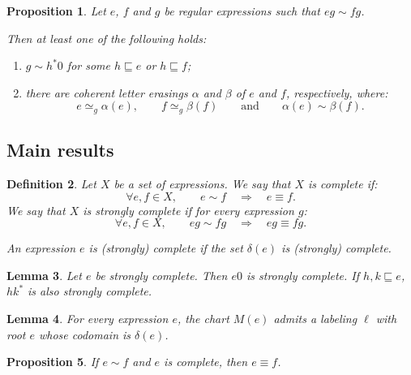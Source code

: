 \documentclass{article}
\newtheorem{definition}{Definition}[section]
\newtheorem{lemma}[definition]{Lemma}
\newtheorem{proposition}[definition]{Proposition}
\newcommand{\milner}[1]{M(#1)}
\begin{document}
\begin{proposition}\label{prop:sim-sim-or-sim-h-star-0}
  Let $e$, $f$ and $g$ be regular expressions such that $eg \sim fg$. \smallskip

  \noindent Then at least one of the following holds:
  \begin{enumerate}
    \item $g \sim h^* 0$ for some $h \sqsubseteq e$ or $h \sqsubseteq f$;
    \item there are coherent letter erasings $\alpha$ and $\beta$ of $e$ and $f$,
    respectively, where:
    \[
      e{\simeq_g}\alpha(e),\qquad
      f{\simeq_g}\beta(f)
      \qquad\text{and}\qquad
      \alpha(e)\sim\beta(f).
    \]
  \end{enumerate}
\end{proposition}







\subsection{Main results}

\begin{definition} Let $X$ be a set of expressions. We say that $X$ is \emph{complete} if: 
  \[
    \forall e,f\in X,\qquad e\sim f\quad\Longrightarrow\quad e\equiv f. \]
    We say that $X$ is \emph{strongly complete} if for every expression $g$: 
    \[
      \forall e,f\in X,\qquad eg\sim fg\quad\Longrightarrow\quad eg\equiv fg. \]

  \noindent An expression $e$ is \emph{(strongly) complete} if the set $\delta(e)$
  is (strongly) complete.
\end{definition}

\begin{lemma}\label{lem:strong-completeness-closure}
  Let $e$ be strongly complete. Then $e0$ is strongly complete. 
  If $h,k\sqsubseteq e$, $hk^*$ is also strongly complete.
\end{lemma}

\begin{lemma}\label{lem:labeling-by-derivatives}
  For every expression $e$, the chart $\milner{e}$ admits a labeling $\ell$
  with root $e$ whose codomain is $\delta(e)$.
\end{lemma}


\begin{proposition}\label{prop:complete-bisim}
If $e \sim f$ and $e$ is complete, then $e \equiv f$.
\end{proposition}
\end{document}
